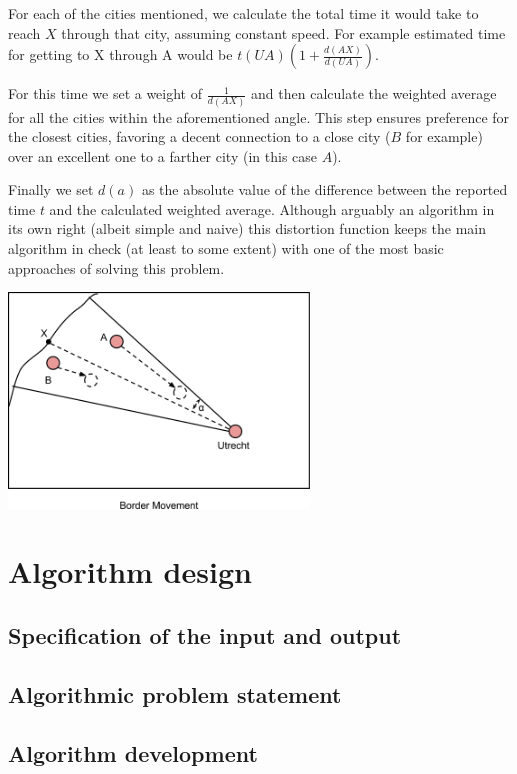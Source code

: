 \documentclass[a4paper,11pt]{article}
\begin{document}
\begin{enumerate}[(i)]
      For each of the cities mentioned, we calculate the total time it
      would take to reach $X$ through that city, assuming constant
      speed. For example estimated time for getting to X through A
      would be $t(UA)(1 + \frac{d(AX)}{d(UA)})$.

      For this time we set a weight of $\frac{1}{d(AX)}$ and then calculate the
      weighted average for all the cities within the aforementioned
      angle. This step ensures preference for the closest cities,
      favoring a decent connection to a close city ($B$ for example)
      over an excellent one to a farther city (in this case $A$).

      Finally we set $d(a)$ as the absolute value of the difference
      between the reported time $t$ and the calculated weighted
      average. Although arguably an algorithm in its own right (albeit
      simple and naive) this distortion function keeps the main
      algorithm in check (at least to some extent) with one of the
      most basic approaches of solving this problem.

    \begin{center}
        \includegraphics[width=0.6\textwidth]{quant7.png}
    \end{center}
\end{enumerate}

\section{Algorithm design}

\subsection{Specification of the input and output}
\subsection{Algorithmic problem statement}
\subsection{Algorithm development}
\end{document}

